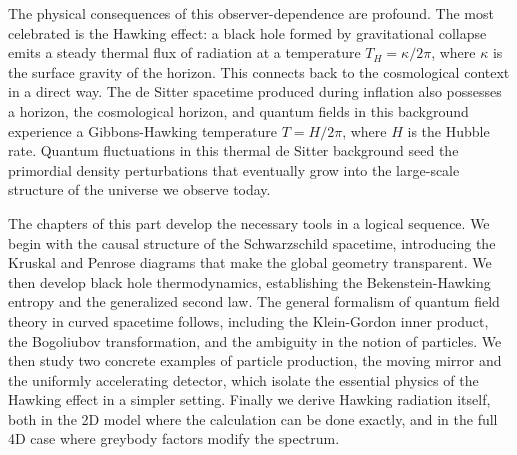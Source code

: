 The physical consequences of this observer-dependence are profound.
The most celebrated is the Hawking effect: a black hole formed by
gravitational collapse emits a steady thermal flux of radiation at
a temperature $T_H = \kappa/2\pi$, where $\kappa$ is the surface
gravity of the horizon. This connects back to the cosmological context
in a direct way. The de Sitter spacetime produced during inflation also
possesses a horizon, the cosmological horizon, and quantum fields in
this background experience a Gibbons-Hawking temperature $T = H/2\pi$,
where $H$ is the Hubble rate. Quantum fluctuations in this thermal de
Sitter background seed the primordial density perturbations that
eventually grow into the large-scale structure of the universe we
observe today.

The chapters of this part develop the necessary tools in a logical
sequence. We begin with the causal structure of the Schwarzschild
spacetime, introducing the Kruskal and Penrose diagrams that make the
global geometry transparent. We then develop black hole thermodynamics,
establishing the Bekenstein-Hawking entropy and the generalized second
law. The general formalism of quantum field theory in curved spacetime
follows, including the Klein-Gordon inner product, the Bogoliubov
transformation, and the ambiguity in the notion of particles. We then
study two concrete examples of particle production, the moving mirror
and the uniformly accelerating detector, which isolate the essential
physics of the Hawking effect in a simpler setting. Finally we derive
Hawking radiation itself, both in the 2D model where the calculation
can be done exactly, and in the full 4D case where greybody factors
modify the spectrum.
